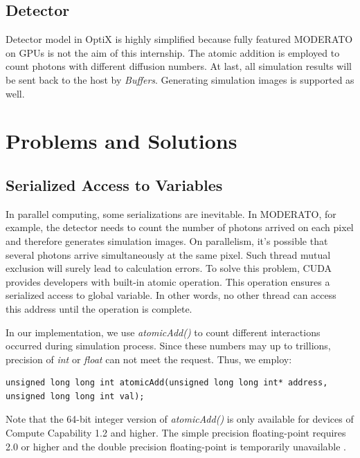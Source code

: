 
\subsection{Detector}
Detector model in OptiX is highly simplified because fully featured MODERATO on GPUs is not the aim of this internship. The atomic addition is employed to count photons with different diffusion numbers. At last, all simulation results will be sent back to the host by \textit{Buffers}. Generating simulation images is supported as well.


\section{Problems and Solutions}


\subsection{Serialized Access to Variables}
In parallel computing, some serializations are inevitable. In MODERATO, for example, the detector needs to count the number of photons arrived on each pixel and therefore generates simulation images. On parallelism, it's possible that several photons arrive simultaneously at the same pixel. Such thread mutual exclusion will surely lead to calculation errors. To solve this problem, CUDA provides developers with built-in atomic operation. This operation ensures a serialized access to global variable. In other words, no other thread can access this address until the operation is complete.

In our implementation, we use \textit{atomicAdd()} to count different interactions occurred during simulation process. Since these numbers may up to trillions, precision of \textit{int} or \textit{float} can not meet the request. Thus, we employ:
\begin{lstlisting}[mathescape]
    unsigned long long int atomicAdd(unsigned long long int* address, unsigned long long int val);
\end{lstlisting}
Note that the 64-bit integer version of \textit{atomicAdd()} is only available for devices of Compute Capability 1.2 and higher. The simple precision floating-point requires 2.0 or higher and the double precision floating-point is temporarily unavailable \citep{cudaguide}.

